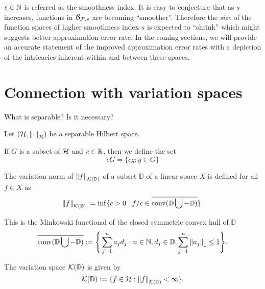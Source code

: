 $s \in \mathbb{N}$ is referred as the smoothness index. It is easy to conjecture
that as $s$ increases, functions in $\mathcal{B}_{\mathcal{F}, s}$ are becoming
``smoother''. Therefore the \textit{size} of the function spaces of higher
smoothness index $s$ is expected to ``shrink'' which might suggests better
approximation error rate. In the coming sections, we will provide an accurate
statement of the improved approximation error rates with a depiction of the
intricacies inherent within and between these spaces.


\section{Connection with variation spaces}

What is separable? Is it necessary?

Let $(\mathcal{H}, \left\| \cdot \right\|_{\mathcal{H}})$ be a separable Hilbert space.

If $G$ is a subset of $\mathcal{H}$ and $c \in \mathbb{R}$, then we define the set
\begin{equation}
    cG = \{cg: g \in G\}
\end{equation}


\begin{definition}
    The variation norm of $\left\| {f} \right\|_{\mathcal{K}({\mathbb{D}})}$ of a subset $\mathbb{D}$ of
    a linear space $X$ is defined for all $f \in X$ as
    \begin{equation}
        \left\| {f} \right\|_{\mathcal{K}({\mathbb{D}})} := \inf \{
            c > 0: f/c \in \overline{\textnormal{conv}(\mathbb{D} \bigcup - \mathbb{D})}
        \}.
    \end{equation}

    This is the Minkowski functional of the closed symmetric convex hull of $\mathbb{D}$
    \begin{equation}
        \overline{\textnormal{conv}(\mathbb{D} \bigcup - \mathbb{D})} := \Bigg\{ 
            \sum_{j=1}^n a_j d_j: n \in \mathbb{N}, d_j \in \mathbb{D}, 
            \sum_{j=1}^n \left\| a_j \right\|_1 \leq 1
        \Bigg\}.
    \end{equation}
\end{definition}

\begin{definition}
    The variation space $\mathcal{K}({\mathbb{D}})$ is given by
    \begin{equation}
        \mathcal{K}({\mathbb{D}}) := \{ 
            f \in \mathcal{H}: \left\| {f} \right\|_{\mathcal{K}({\mathbb{D}})} < \infty
        \}.
    \end{equation}
\end{definition}

